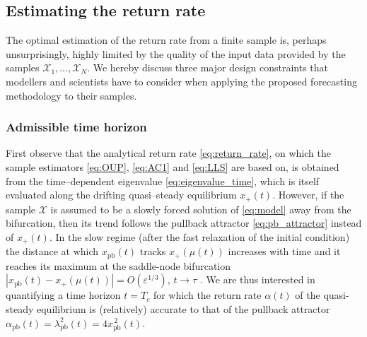\documentclass[openacc]{rsproca_new}
\begin{document}
\subsection{Estimating the return rate}\label{subsec:estimators}
The optimal estimation of the return rate from a finite sample is, perhaps unsurprisingly, highly limited by the quality of the input data provided by the samples $\mathcal{X}_1,\dots,\mathcal{X}_N$.
We hereby discuss three major design constraints that modellers and scientists have to consider when applying the proposed forecasting methodology to their samples.

\subsubsection{Admissible time horizon}\label{subsubsec:horizon}

First observe that the analytical return rate \eqref{eq:return_rate}, on which the sample estimators \eqref{eq:OUP}, \eqref{eq:AC1} and \eqref{eq:LLS} are based on, is obtained from the time--dependent eigenvalue \eqref{eq:eigenvalue_time}, which is itself evaluated along the drifting quasi--steady equilibrium $x_+(t)$.
However, if the sample $\mathcal{X}$ is assumed to be a slowly forced solution of \eqref{eq:model} away from the bifurcation, then its trend follows the pullback attractor \eqref{eq:pb_attractor} instead of $x_+(t)$.
In the slow regime (after the fast relaxation of the initial condition) the distance at which $x_{\mathrm{pb}}(t)$ tracks $x_+(\mu(t))$ increases with time and it reaches its maximum at the saddle-node bifurcation $|x_{\mathrm{pb}}(t)-x_+(\mu(t))|=O(\varepsilon^{1/3})$, $t\to\tau$ \cite[Thm.~$2.2.2$]{Berglund2006}.
We are thus interested in quantifying a time horizon $t=T_c$ for which the return rate $\alpha(t)$ of the quasi-steady equilibrium is (relatively) accurate to that of the pullback attractor $\alpha_{\mathrm{pb}}(t)=\lambda_{\mathrm{pb}}^2(t)=4x_{\mathrm{pb}}^{\,2}(t)$.
\end{document}
